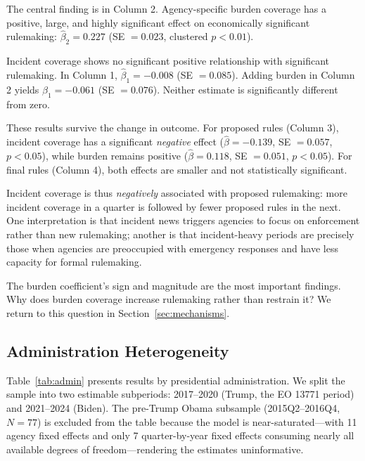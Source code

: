 \documentclass[12pt]{article}
\begin{document}
The central finding is in Column 2. Agency-specific burden coverage has a positive, large, and highly significant effect on economically significant rulemaking: $\hat\beta_2 = 0.227$ (SE $= 0.023$, clustered $p < 0.01$).

Incident coverage shows no significant positive relationship with significant rulemaking. In Column 1, $\hat\beta_1 = -0.008$ (SE $= 0.085$). Adding burden in Column 2 yields $\hat\beta_1 = -0.061$ (SE $= 0.076$). Neither estimate is significantly different from zero.

These results survive the change in outcome. For proposed rules (Column 3), incident coverage has a significant \emph{negative} effect ($\hat\beta = -0.139$, SE $= 0.057$, $p < 0.05$), while burden remains positive ($\hat\beta = 0.118$, SE $= 0.051$, $p < 0.05$). For final rules (Column 4), both effects are smaller and not statistically significant.

Incident coverage is thus \emph{negatively} associated with proposed rulemaking: more incident coverage in a quarter is followed by fewer proposed rules in the next. One interpretation is that incident news triggers agencies to focus on enforcement rather than new rulemaking; another is that incident-heavy periods are precisely those when agencies are preoccupied with emergency responses and have less capacity for formal rulemaking.

The burden coefficient's sign and magnitude are the most important findings. Why does burden coverage increase rulemaking rather than restrain it? We return to this question in Section~\ref{sec:mechanisms}.

\subsection{Administration Heterogeneity}



Table~\ref{tab:admin} presents results by presidential administration. We split the sample into two estimable subperiods: 2017--2020 (Trump, the EO 13771 period) and 2021--2024 (Biden). The pre-Trump Obama subsample (2015Q2--2016Q4, $N=77$) is excluded from the table because the model is near-saturated---with 11 agency fixed effects and only 7 quarter-by-year fixed effects consuming nearly all available degrees of freedom---rendering the estimates uninformative.
\end{document}
